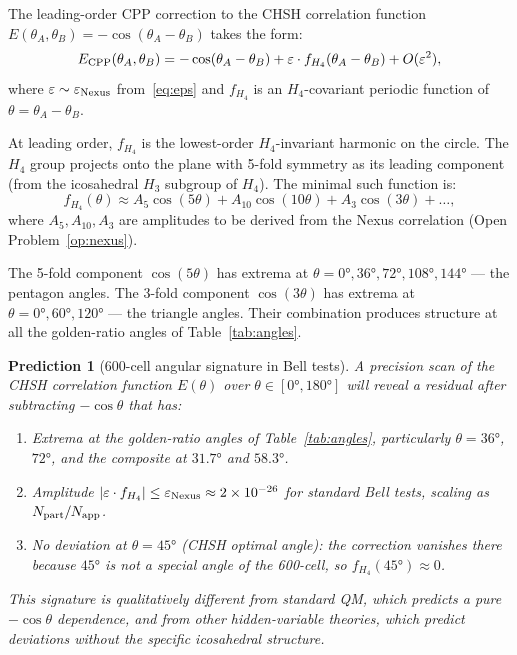 \documentclass[11pt,a4paper]{article}
\newtheorem{prediction}[theorem]{Prediction}
\newcommand{\eps}{\varepsilon}
\begin{document}
The leading-order CPP correction to the CHSH correlation function
$E(\theta_A, \theta_B) = -\cos(\theta_A - \theta_B)$ takes the form:
\begin{equation}
E_{\rm CPP}(\theta_A, \theta_B)
= -\cos(\theta_A - \theta_B)
  + \eps \cdot f_{H_4}(\theta_A - \theta_B) + O(\eps^2),
\label{eq:E_CPP}
\end{equation}
where $\eps \sim \eps_{\rm Nexus}$ from~\eqref{eq:eps} and
$f_{H_4}$ is an $H_4$-covariant periodic function of
$\theta = \theta_A - \theta_B$.

At leading order, $f_{H_4}$ is the lowest-order $H_4$-invariant
harmonic on the circle.  The $H_4$ group projects onto the plane
with 5-fold symmetry as its leading component (from the icosahedral
$H_3$ subgroup of $H_4$).  The minimal such function is:
\begin{equation}
f_{H_4}(\theta) \approx A_5 \cos(5\theta) + A_{10}\cos(10\theta)
+ A_3 \cos(3\theta) + \ldots,
\label{eq:f_H4}
\end{equation}
where $A_5, A_{10}, A_3$ are amplitudes to be derived from the Nexus
correlation (Open Problem~\ref{op:nexus}).

The 5-fold component $\cos(5\theta)$ has extrema at $\theta = 0°,
36°, 72°, 108°, 144°$ --- the pentagon angles.  The 3-fold component
$\cos(3\theta)$ has extrema at $\theta = 0°, 60°, 120°$ --- the
triangle angles.  Their combination produces structure at all the
golden-ratio angles of Table~\ref{tab:angles}.

\begin{prediction}[600-cell angular signature in Bell tests]
\label{pred:angular}
A precision scan of the CHSH correlation function $E(\theta)$ over
$\theta \in [0°, 180°]$ will reveal a residual after subtracting
$-\cos\theta$ that has:
\begin{enumerate}
\item Extrema at the golden-ratio angles of Table~\ref{tab:angles},
  particularly $\theta = 36°$, $72°$, and the composite at $31.7°$
  and $58.3°$.
\item Amplitude $|\eps \cdot f_{H_4}| \leq \eps_{\rm Nexus}
  \approx 2 \times 10^{-26}$ for standard Bell tests,
  scaling as $N_{\rm part}/N_{\rm app}$.
\item No deviation at $\theta = 45°$ (CHSH optimal angle): the
  correction vanishes there because $45°$ is not a special angle
  of the 600-cell, so $f_{H_4}(45°) \approx 0$.
\end{enumerate}
This signature is \emph{qualitatively} different from standard QM,
which predicts a pure $-\cos\theta$ dependence, and from other
hidden-variable theories, which predict deviations without the
specific icosahedral structure.
\end{prediction}
\end{document}
